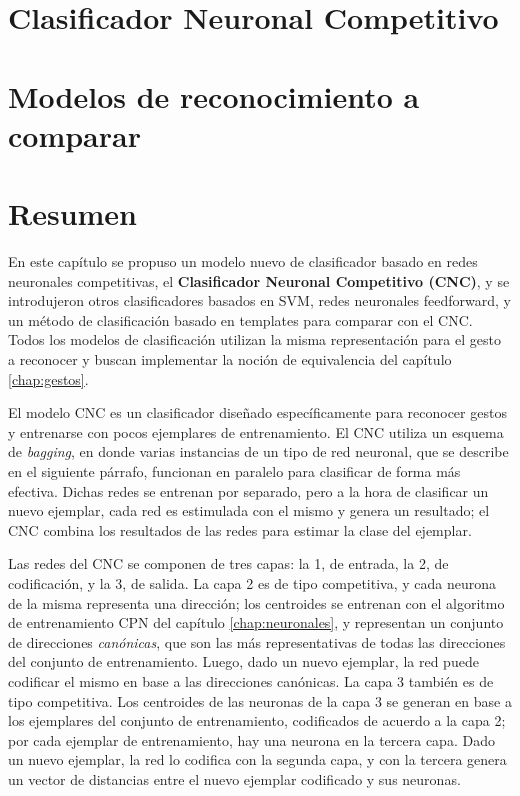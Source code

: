 \section{Clasificador Neuronal Competitivo}


\section{Modelos de reconocimiento a comparar}


\section{Resumen}

En este capítulo se propuso un modelo nuevo de clasificador basado en redes neuronales competitivas, el \textbf{Clasificador Neuronal Competitivo (CNC)}, y se introdujeron otros clasificadores basados en SVM, redes neuronales feedforward, y un método de clasificación basado en templates para comparar con el CNC. Todos los modelos de clasificación utilizan la misma representación para el gesto a reconocer y buscan implementar la noción de equivalencia del capítulo \ref{chap:gestos}.

El modelo CNC es un clasificador diseñado específicamente para reconocer gestos y entrenarse con pocos ejemplares de entrenamiento. El CNC utiliza un esquema de \textit{bagging}, en donde varias instancias de un tipo de red neuronal, que se describe en el siguiente párrafo, funcionan en paralelo para clasificar de forma más efectiva. Dichas redes se entrenan por separado, pero a la hora de clasificar un nuevo ejemplar, cada red es estimulada con el mismo y genera un resultado; el CNC combina los resultados de las redes para estimar la clase del ejemplar.

Las redes del CNC se componen de tres capas: la 1, de entrada, la 2, de codificación, y la 3, de salida. 
La capa 2 es de tipo competitiva, y cada neurona de la misma representa una dirección; los centroides se entrenan con el algoritmo de entrenamiento CPN del capítulo \ref{chap:neuronales}, y representan un conjunto de direcciones \textit{canónicas}, que son las más representativas de todas las direcciones del conjunto de entrenamiento. Luego, dado un nuevo ejemplar, la red puede codificar el mismo en base a las direcciones canónicas. 
La capa 3 también es de tipo competitiva. Los centroides de las neuronas de la capa 3 se generan en base a los ejemplares del conjunto de entrenamiento, codificados de acuerdo a la capa 2; por cada ejemplar de entrenamiento, hay una neurona en la tercera capa. Dado un nuevo ejemplar, la red lo codifica con la segunda capa, y con la tercera genera un vector de distancias entre el nuevo ejemplar codificado y sus neuronas.

